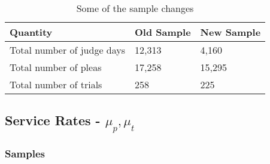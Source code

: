 \documentclass[11pt]{article}
\begin{document}
  \begin{table}[H]
    \centering
    \caption{Some of the sample changes}
    \label{tab:sample}
    \begin{tabular}{|l|l|l|}
    \hline
    \textbf{Quantity}          & \textbf{Old Sample} & \textbf{New Sample} \\ \hline
    Total number of judge days & 12,313              & 4,160               \\ \hline
    Total number of pleas      & 17,258              & 15,295              \\ \hline
    Total number of trials     & 258                 & 225                 \\ \hline
    \end{tabular}
  \end{table}

  \subsection{Service Rates - $\mu_p,\mu_t$}
    \subsubsection{Samples}
\end{document}
